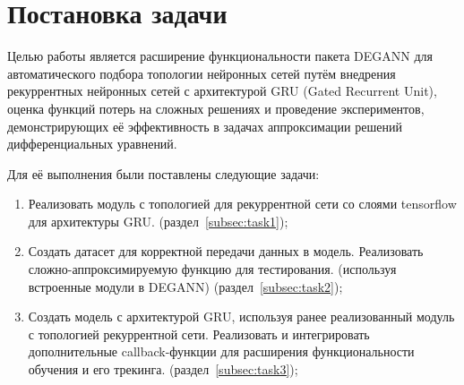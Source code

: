 
\section{Постановка задачи}
\label{sec:task}

Целью работы является расширение функциональности пакета DEGANN для автоматического подбора топологии нейронных сетей путём внедрения рекуррентных нейронных сетей с архитектурой GRU (Gated Recurrent Unit), оценка функций потерь на сложных решениях и проведение экспериментов, демонстрирующих её эффективность в задачах аппроксимации решений дифференциальных уравнений.

Для её выполнения были поставлены следующие задачи:
\begin{enumerate}
    \item Реализовать модуль с топологией для рекуррентной сети со слоями tensorflow для архитектуры GRU. (раздел~\ref{subsec:task1});
    \item Создать датасет для корректной передачи данных в модель. Реализовать сложно-аппроксимируемую функцию для тестирования. (используя встроенные модули в DEGANN) (раздел~\ref{subsec:task2});
    \item Создать модель с архитектурой GRU, используя ранее реализованный модуль с топологией рекуррентной сети. Реализовать и интегрировать дополнительные callback-функции для расширения функциональности обучения и его трекинга. (раздел~\ref{subsec:task3});
\end{enumerate}
